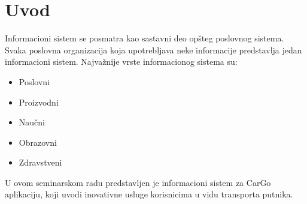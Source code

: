\section{\bfseries Uvod}
\par Informacioni sistem se posmatra kao sastavni deo opšteg poslovnog sistema. Svaka poslovna organizacija koja upotrebljava neke informacije predstavlja jedan informacioni sistem. Najvažnije vrste informacionog sistema su: 
\begin{itemize}
	\item Poslovni
	\item Proizvodni
	\item Naučni
	\item Obrazovni
	\item Zdravstveni
\end{itemize}
U ovom seminarskom radu predstavljen je informacioni sistem za CarGo aplikaciju, koji uvodi inovativne usluge korisnicima u vidu transporta putnika.